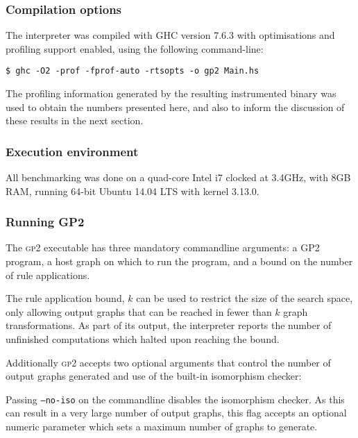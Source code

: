 \subsubsection*{Compilation options}

The interpreter was compiled with GHC version 7.6.3 with optimisations and profiling support enabled, using the following command-line:

\begin{verbatim}
$ ghc -O2 -prof -fprof-auto -rtsopts -o gp2 Main.hs
\end{verbatim}

The profiling information generated by the resulting instrumented binary was used to obtain the numbers presented here, and also to inform the discussion of these results in the next section.

\subsubsection*{Execution environment}

All benchmarking was done on a quad-core Intel i7 clocked at 3.4GHz, with 8GB RAM, running 64-bit Ubuntu 14.04 LTS with kernel 3.13.0.

\subsubsection*{Running GP2}

The \textsc{gp2} executable has three mandatory commandline arguments: a GP2 program, a host graph on which to run the program, and a bound on the number of rule applications.

The rule application bound, $k$ can be used to restrict the size of the search space, only allowing output graphs that can be reached in fewer than $k$ graph transformations. As part of its output, the interpreter reports the number of unfinished computations which halted upon reaching the bound.


Additionally \textsc{gp2} accepts two optional arguments that control the number of output graphs generated and use of the built-in isomorphism checker:

Passing \texttt{--no-iso} on the commandline disables the isomorphism checker. As this can result in a very large number of output graphs, this flag accepts an optional numeric parameter which sets a maximum number of graphs to generate.

